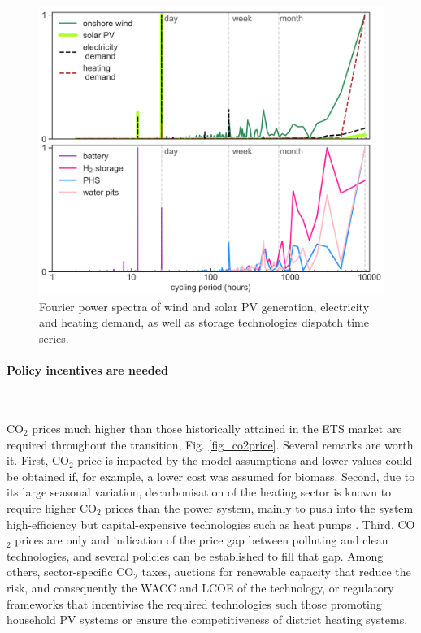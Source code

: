 \documentclass[5p]{elsarticle} %
\begin{document}
\begin{figure}[!h]
\centering
\includegraphics[width=\columnwidth]{figures/Fourier.png}
\caption{Fourier power spectra of wind and solar PV generation, electricity and heating demand, as well as storage technologies dispatch time series.} \label{fig_Fourier} 
\end{figure}

\FloatBarrier
 
\paragraph{\textbf{Policy incentives are needed}} \

CO$_2$ prices much higher than those historically attained in the ETS market are required throughout the transition, Fig. \ref{fig_co2price}. Several remarks are worth it. First, CO$_2$ price is impacted by the model assumptions and lower values could be obtained if, for example, a lower cost was assumed for biomass. Second, due to its large seasonal variation, decarbonisation of the heating sector is known to require higher CO$_2$ prices than the power system, mainly to push into the system high-efficiency but capital-expensive technologies such as heat pumps \cite{Brown_2018, Victoria_2019_storage}. Third, CO$_2$ prices are only and indication of the price gap between polluting and clean technologies, and several policies can be established to fill that gap. Among others, sector-specific CO$_2$ taxes, auctions for renewable capacity that reduce the risk, and consequently the WACC and LCOE of the technology, or regulatory frameworks that incentivise the required technologies such those promoting household PV systems or ensure the competitiveness of district heating systems.
\end{document}
